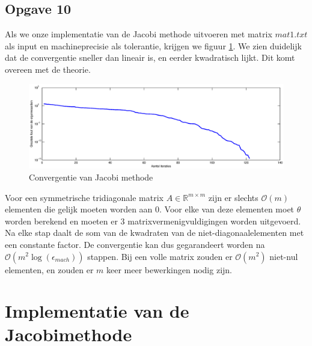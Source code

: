 \documentclass[a4paper, 12pt, titlepage]{report}
\begin{document}
\subsection{Opgave 10}
Als we onze implementatie van de Jacobi methode uitvoeren met matrix $mat1.txt$ als input en machineprecisie als tolerantie, krijgen we figuur \ref{jacobigraph}. We zien duidelijk dat de convergentie sneller dan lineair is, en eerder kwadratisch lijkt. Dit komt overeen met de theorie. \\
\begin{figure}[htb]
	\begin{center}
	 \includegraphics[width=\textwidth]{jacobi.eps}
	\caption{Convergentie van Jacobi methode}
	\label{jacobigraph}
	\end{center}
\end{figure}

Voor een symmetrische tridiagonale matrix $A \in \mathbb{R}^{m\times m}$ zijn er slechts $\mathcal{O}(m)$ elementen die gelijk moeten worden aan 0. Voor elke van deze elementen moet $\theta$ worden berekend en moeten er 3 matrixvermenigvuldigingen worden uitgevoerd. Na elke stap daalt de som van de kwadraten van de niet-diagonaalelementen met een constante factor. De convergentie kan dus gegarandeert worden na $\mathcal{O}(m^2\log(\epsilon_{mach}))$ stappen. Bij een volle matrix zouden er $\mathcal{O}(m^2)$ niet-nul elementen, en zouden er $m$ keer meer bewerkingen nodig zijn.\\
\section{Implementatie van de Jacobimethode}

\end{document}
